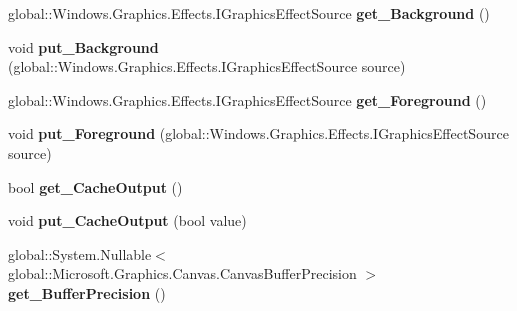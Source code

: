 \begin{DoxyCompactItemize}
global\+::\+Windows.\+Graphics.\+Effects.\+I\+Graphics\+Effect\+Source {\bfseries get\+\_\+\+Background} ()
\item 
\mbox{\label{class_microsoft_1_1_graphics_1_1_canvas_1_1_effects_1_1_blend_effect_abd598b6c76aa0c92ce04d0ec53ec328e}} 
void {\bfseries put\+\_\+\+Background} (global\+::\+Windows.\+Graphics.\+Effects.\+I\+Graphics\+Effect\+Source source)
\item 
\mbox{\label{class_microsoft_1_1_graphics_1_1_canvas_1_1_effects_1_1_blend_effect_a10ccecae64e09d405b1921dc72bcd69d}} 
global\+::\+Windows.\+Graphics.\+Effects.\+I\+Graphics\+Effect\+Source {\bfseries get\+\_\+\+Foreground} ()
\item 
\mbox{\label{class_microsoft_1_1_graphics_1_1_canvas_1_1_effects_1_1_blend_effect_a898a9aa44604170ad7f898b4cc45c084}} 
void {\bfseries put\+\_\+\+Foreground} (global\+::\+Windows.\+Graphics.\+Effects.\+I\+Graphics\+Effect\+Source source)
\item 
\mbox{\label{class_microsoft_1_1_graphics_1_1_canvas_1_1_effects_1_1_blend_effect_a5277510deb8dcc175e62db9fab054126}} 
bool {\bfseries get\+\_\+\+Cache\+Output} ()
\item 
\mbox{\label{class_microsoft_1_1_graphics_1_1_canvas_1_1_effects_1_1_blend_effect_abf6fc226936245b186bd77eb7281c6ed}} 
void {\bfseries put\+\_\+\+Cache\+Output} (bool value)
\item 
\mbox{\label{class_microsoft_1_1_graphics_1_1_canvas_1_1_effects_1_1_blend_effect_a77470fdd2f3361cf0ef9ed3c79ffb8b8}} 
global\+::\+System.\+Nullable$<$ global\+::\+Microsoft.\+Graphics.\+Canvas.\+Canvas\+Buffer\+Precision $>$ {\bfseries get\+\_\+\+Buffer\+Precision} ()
\item 
\mbox{\label{class_microsoft_1_1_graphics_1_1_canvas_1_1_effects_1_1_blend_effect_a3eeb0529f739eebd077cbf5b93e8ebd0}} 

\end{DoxyCompactItemize}
